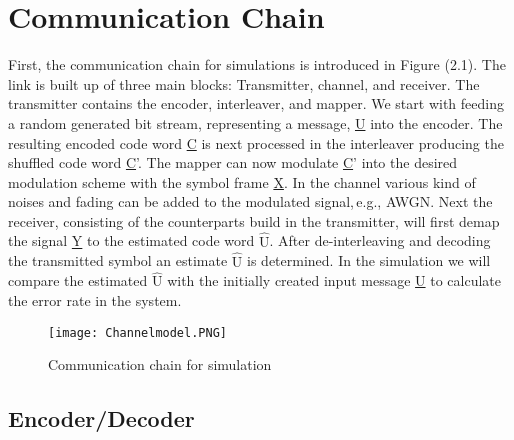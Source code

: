 \chapter{Communication Chain} 
\label{chap:commchain}
\graphicspath{{C:/Users/Kevin/Bachelarbeit/Bachelorarbeit/01_Bachelorarbeit_LaTex/02_Figures/}}


First, the communication chain for simulations is introduced in Figure (2.1). The link is built up of three main blocks: Transmitter, channel, and receiver. The transmitter contains the encoder, interleaver, and mapper. We start with feeding a random generated bit stream, representing a message, \underline{U} into the encoder. The resulting encoded code word \underline{C} is next processed in the interleaver producing the shuffled code word \underline{C}'. The mapper can now modulate \underline{C}' into the desired modulation scheme with the symbol frame \underline{X}. In the channel various kind of noises and fading can be added to the modulated signal,\,e.g., \gls{AWGN}. Next the receiver, consisting of the counterparts build in the transmitter, will first demap the signal \underline{Y} to the estimated code word \underline{$\hat{\textrm{U}}$}. After de-interleaving and decoding the transmitted symbol an estimate \underline{$\hat{\textrm{U}}$} is determined. In the simulation we will compare the estimated \underline{$\hat{\textrm{U}}$} with the initially created input message \underline{U} to calculate the error rate in the system.
\begin{figure}[!htb]
	\centering
	\texttt{[image: Channelmodel.PNG]}
	\caption{Communication chain for simulation}
	\label{fig:commchain}
\end{figure}

\section{Encoder/Decoder}
\label{sec:enc}


